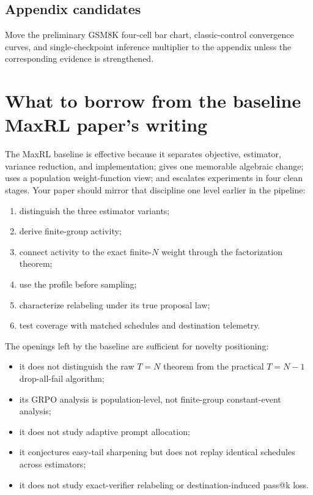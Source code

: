 \documentclass[11pt]{article}
\theoremstyle{definition}
\theoremstyle{remark}
\begin{document}
\subsection{Appendix candidates}

Move the preliminary GSM8K four-cell bar chart, classic-control convergence curves, and single-checkpoint inference multiplier to the appendix unless the corresponding evidence is strengthened.

\section{What to borrow from the baseline MaxRL paper's writing}

The MaxRL baseline is effective because it separates objective, estimator, variance reduction, and implementation; gives one memorable algebraic change; uses a population weight-function view; and escalates experiments in four clean stages. Your paper should mirror that discipline one level earlier in the pipeline:

\begin{enumerate}[leftmargin=2em]
\item distinguish the three estimator variants;
\item derive finite-group activity;
\item connect activity to the exact finite-$N$ weight through the factorization theorem;
\item use the profile before sampling;
\item characterize relabeling under its true proposal law;
\item test coverage with matched schedules and destination telemetry.
\end{enumerate}

The openings left by the baseline are sufficient for novelty positioning:

\begin{itemize}[leftmargin=2em]
\item it does not distinguish the raw $T=N$ theorem from the practical $T=N-1$ drop-all-fail algorithm;
\item its GRPO analysis is population-level, not finite-group constant-event analysis;
\item it does not study adaptive prompt allocation;
\item it conjectures easy-tail sharpening but does not replay identical schedules across estimators;
\item it does not study exact-verifier relabeling or destination-induced pass@k loss.
\end{itemize}
\end{document}
